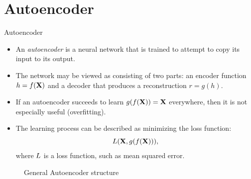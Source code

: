 \documentclass[xcolor=pdftex,dvipsnames,table,mathserif]{beamer}
\begin{document}
\section{Autoencoder}
\begin{frame}{Autoencoder}
\begin{itemize}
\item An \emph{autoencoder} is a neural network that is trained to attempt to copy its input to its output.
\item The network may be viewed as consisting of two parts: an
encoder function $h = f (\mathbf{X})$ and a decoder that produces a reconstruction $r = g(h)$.
\item If an autoencoder succeeds to learn $g(f (\mathbf{X})) = \mathbf{X}$ everywhere, then it is not especially useful (overfitting).
\item The learning process can be described as minimizing the loss function:
\begin{equation}
L ( \mathbf{X} , g(f(\mathbf{X}))),
\end{equation}
where $L$ is a loss function, such as mean squared error.
\end{itemize}
\begin{figure}
\centering
{}
  \caption{General Autoencoder structure}
\end{figure}
\end{frame}
\end{document}
